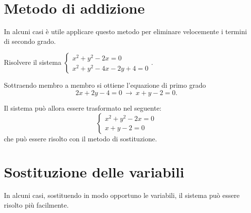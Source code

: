 \section{Metodo di addizione}

In alcuni casi è utile applicare questo metodo per eliminare velocemente i termini di secondo grado.

\begin{exrig}
\begin{esempio}
Risolvere il sistema $\left\{\begin{array}{l}x^2+y^2-2x=0 \\x^2+y^2-4x-2y+4=0 \end{array}\right.$.

Sottraendo membro a membro si ottiene l'equazione di primo grado \[2x+2y-4=0~\rightarrow~ x+y-2=0.\]

Il sistema può allora essere trasformato nel seguente:
\[\left\{\begin{array}{l}x^2+y^2-2x=0 \\x+y-2=0 \end{array}\right.\]
che può essere risolto con il metodo di sostituzione.
\end{esempio}
\end{exrig}
\ovalbox{\risolvi \ref{ese:6.61}}
\pagebreak
\section{Sostituzione delle variabili}

In alcuni casi, sostituendo in modo opportuno le variabili, il sistema può essere risolto più facilmente.

